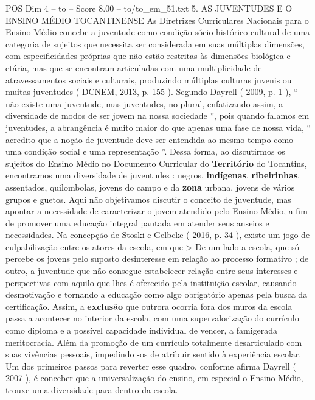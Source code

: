 \begin{textsample}{POS Dim 4 – to – Score 8.00 – to/to\_em\_51.txt}  \label{ex:f4_pos_207}
5.
AS JUVENTUDES E O ENSINO MÉDIO TOCANTINENSE As Diretrizes Curriculares Nacionais para o Ensino Médio concebe a juventude como condição sócio-histórico-cultural de uma categoria de sujeitos que necessita ser considerada em suas múltiplas dimensões, com especificidades próprias que não estão restritas às dimensões biológica e etária, mas que se encontram articuladas com uma multiplicidade de atravessamentos sociais e culturais, produzindo múltiplas culturas juvenis ou muitas juventudes ( DCNEM, 2013, p. 155 ).
Segundo Dayrell ( 2009, p. 1 ), “ não existe uma juventude, mas juventudes, no plural, enfatizando assim, a diversidade de modos de ser jovem na nossa sociedade ”, pois quando falamos em juventudes, a abrangência é muito maior do que apenas uma fase de nossa vida, “ acredito que a noção de juventude deve ser entendida ao mesmo tempo como uma condição social e uma representação ”.
Dessa forma, ao discutirmos os sujeitos do Ensino Médio no Documento Curricular do \textbf{Território} do Tocantins, encontramos uma diversidade de juventudes : negros, \textbf{indígenas}, \textbf{ribeirinhas}, assentados, quilombolas, jovens do campo e da \textbf{zona} urbana, jovens de vários grupos e guetos.
Aqui não objetivamos discutir o conceito de juventude, mas apontar a necessidade de caracterizar o jovem atendido pelo Ensino Médio, a fim de promover uma educação integral pautada em atender seus anseios e necessidades.
Na concepção de Stoski e Gelbcke ( 2016, p. 34 ), existe um jogo de culpabilização entre os atores da escola, em que > De um lado a escola, que só percebe os jovens pelo suposto desinteresse em relação ao processo formativo ; de outro, a juventude que não consegue estabelecer relação entre seus interesses e perspectivas com aquilo que lhes é oferecido pela instituição escolar, causando desmotivação e tornando a educação como algo obrigatório apenas pela busca da certificação.
Assim, a \textbf{exclusão} que outrora ocorria fora dos muros da escola passa a acontecer no interior da escola, com uma supervalorização do currículo como diploma e a possível capacidade individual de vencer, a famigerada meritocracia.
Além da promoção de um currículo totalmente desarticulado com suas vivências pessoais, impedindo -os de atribuir sentido à experiência escolar.
Um dos primeiros passos para reverter esse quadro, conforme afirma Dayrell ( 2007 ), é conceber que a universalização do ensino, em especial o Ensino Médio, trouxe uma diversidade para dentro da escola.

\end{textsample}
